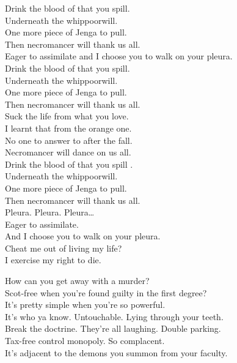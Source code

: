 Drink the blood of that you spill. \\
Underneath the whippoorwill. \\
One more piece of Jenga to pull. \\
Then necromancer will thank us all. \\

Eager to assimilate and I choose you to walk on your pleura. \\

Drink the blood of that you spill. \\
Underneath the whippoorwill. \\
One more piece of Jenga to pull. \\
Then necromancer will thank us all. \\
Suck the life from what you love. \\
I learnt that from the orange one. \\
No one to answer to after the fall. \\
Necromancer will dance on us all. \\
Drink the blood of that you spill . \\
Underneath the whippoorwill. \\
One more piece of Jenga to pull. \\
Then necromancer will thank us all. \\

Pleura. Pleura. Pleura… \\

Eager to assimilate. \\
And I choose you to walk on your pleura. \\
Cheat me out of living my life? \\
I exercise my right to die. \\




How can you get away with a murder? \\
Scot-free when you're found guilty in the first degree? \\
It's pretty simple when you're so powerful. \\
It's who ya know. Untouchable. Lying through your teeth. \\
Break the doctrine. They're all laughing. Double parking. \\
Tax-free control monopoly. So complacent. \\
It's adjacent to the demons you summon from your faculty. \\

